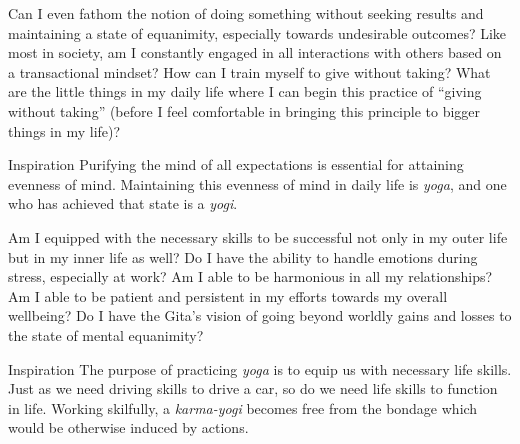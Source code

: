 \newpage
\begin{mananam}{}
\mananamtext Can I even fathom the notion of doing something without seeking results and maintaining a state of equanimity, especially towards undesirable outcomes? Like most in society, am I constantly engaged in all interactions with others based on a transactional mindset? How can I train myself to give without taking? What are the little things in my daily life where I can begin this practice of “giving without taking” (before I feel comfortable in bringing this principle to bigger things in my life)?
\end{mananam}
\WritingHand{}
\begin{inspiration}{\mananamfont Inspiration}
\mananamtext Purifying the mind of all expectations is essential for attaining evenness of mind. Maintaining this evenness of mind in daily life is \emph{yoga}, and one who has achieved that state is a \emph{yogi}.
\end{inspiration}
\newpage

\newpage
\begin{mananam}{}
\mananamtext Am I equipped with the necessary skills to be successful not only in my outer life but in my inner life as well? Do I have the ability to handle emotions during stress, especially at work? Am I able to be harmonious in all my relationships? Am I able to be patient and persistent in my efforts towards my overall wellbeing? Do I have the Gita’s vision of going beyond worldly gains and losses to the state of mental equanimity?
\end{mananam}
\WritingHand{}
\begin{inspiration}{\mananamfont Inspiration}
\mananamtext The purpose of practicing \emph{yoga} is to equip us with necessary life skills. Just as we need driving skills to drive a car, so do we need life skills to function in life. Working skilfully, a \emph{karma-yogi} becomes free from the bondage which would be otherwise induced by actions.
\end{inspiration}
\newpage



